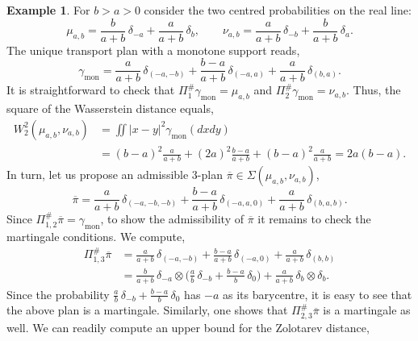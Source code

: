 \documentclass[11pt,reqno]{amsart}
\theoremstyle{definition}
\newtheorem{example}[theorem]{Example}
\numberwithin{equation}{section}
\newcommand{\ov}{\overline}
\newcommand{\abs}[1]{{\left \lvert #1 \right \rvert}}
\begin{document}
\begin{example}
    \label{opt1/4}
    For $b>a>0$ consider the two centred probabilities on the real line:
    \begin{equation*}
        \mu_{a,b} = \frac{b}{a+b}\, \delta_{-a} + \frac{a}{a+b} \,\delta_b, \qquad \nu_{a,b} = \frac{a}{a+b} \,\delta_{-b} + \frac{b}{a+b} \, \delta_a.
    \end{equation*}
    The unique transport plan with a monotone support reads,
    \begin{equation*}
        \gamma_{\mathrm{mon}} = \frac{a}{a+b} \, \delta_{(-a,-b)} + \frac{b-a}{a+b}\, \delta_{(-a,a)} + \frac{a}{a+b} \, \delta_{(b,a)}.
    \end{equation*}
    It is straightforward to check that $\Pi_1^\# \gamma_{\mathrm{mon}} = \mu_{a,b}$ and $\Pi_2^\# \gamma_{\mathrm{mon}} = \nu_{a,b}$.
    Thus, the square of the Wasserstein distance equals,
    \begin{align*}
        W_2^2(\mu_{a,b},\nu_{a,b}) &= \iint \abs{x-y}^2 \gamma_{\mathrm{mon}}(dxdy) \\
        &=(b-a)^2 \frac{a}{a+b} + (2a)^2 \frac{b-a}{a+b} + (b-a)^2 \frac{a}{a+b} = 2a (b-a).
    \end{align*}
    In turn, let us propose an admissible 3-plan $\ov\pi \in \Sigma(\mu_{a,b},\nu_{a,b})$,
    \begin{equation*}
        \ov\pi = \frac{a}{a+b} \, \delta_{(-a,-b,-b)} + \frac{b-a}{a+b} \, \delta_{(-a,a,0)} + \frac{a}{a+b} \, \delta_{(b,a,b)}.
    \end{equation*}
    Since $\Pi_{1,2}^\# \ov\pi = \gamma_{\mathrm{mon}}$, to show the admissibility of $\ov\pi$ it remains to check the martingale conditions. We compute,
    \begin{align*}
        \Pi_{1,3}^\# \ov\pi &= \frac{a}{a+b} \, \delta_{(-a,-b)} + \frac{b-a}{a+b} \, \delta_{(-a,0)} + \frac{a}{a+b} \, \delta_{(b,b)} \\
        & = \frac{b}{a+b} \, \delta_{-a} \otimes  \bigg( \frac{a}{b} \,\delta_{-b} + \frac{b-a}{b} \, \delta_{0} \bigg) +  \frac{a}{a+b} \, \delta_{b} \otimes \delta_b.
    \end{align*}
    Since the probability $\frac{a}{b} \,\delta_{-b} + \frac{b-a}{b} \, \delta_{0}$ has $-a$ as its barycentre, it is easy to see that the above plan is a martingale. Similarly, one shows that $\Pi_{2,3}^\# \ov\pi$ is a martingale as well. We can readily compute an upper bound for the Zolotarev distance,

\end{example}
\end{document}
